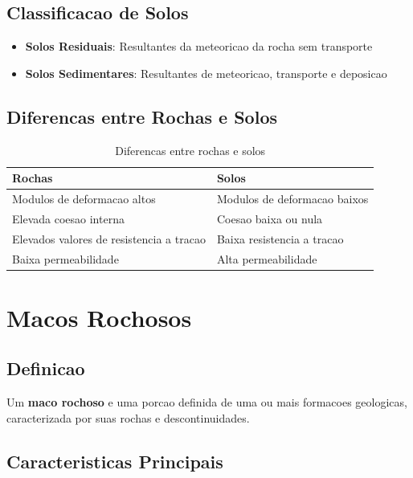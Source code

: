 \documentclass[12pt,a4paper,twoside]{book}
\begin{document}
\subsection{Classificacao de Solos}

\begin{itemize}
    \item \textbf{Solos Residuais}: Resultantes da meteoricao da rocha sem transporte
    \item \textbf{Solos Sedimentares}: Resultantes de meteoricao, transporte e deposicao
\end{itemize}

\subsection{Diferencas entre Rochas e Solos}

\begin{table}[h]
\centering
\begin{tabular}{|l|l|}
\hline
\textbf{Rochas} & \textbf{Solos} \\
\hline
Modulos de deformacao altos & Modulos de deformacao baixos \\
\hline
Elevada coesao interna & Coesao baixa ou nula \\
\hline
Elevados valores de resistencia a tracao & Baixa resistencia a tracao \\
\hline
Baixa permeabilidade & Alta permeabilidade \\
\hline
\end{tabular}
\caption{Diferencas entre rochas e solos}
\label{tab:rochas_solos}
\end{table}

\section{Macos Rochosos}

\subsection{Definicao}

Um \textbf{maco rochoso} e uma porcao definida de uma ou mais formacoes geologicas, caracterizada 
por suas rochas e descontinuidades.

\subsection{Caracteristicas Principais}
\end{document}
